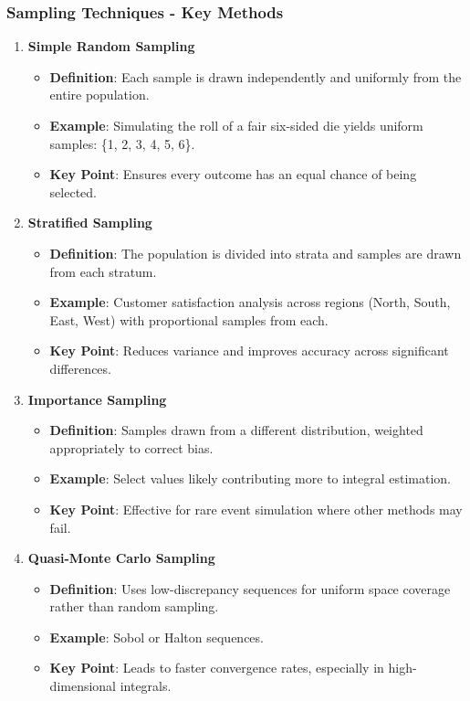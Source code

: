 \documentclass[aspectratio=169]{beamer}
\begin{document}
\begin{frame}[fragile]
  \frametitle{Sampling Techniques - Key Methods}
  \begin{enumerate}
    \item \textbf{Simple Random Sampling}
      \begin{itemize}
        \item \textbf{Definition}: Each sample is drawn independently and uniformly from the entire population.
        \item \textbf{Example}: Simulating the roll of a fair six-sided die yields uniform samples: \{1, 2, 3, 4, 5, 6\}.
        \item \textbf{Key Point}: Ensures every outcome has an equal chance of being selected.
      \end{itemize}

    \item \textbf{Stratified Sampling}
      \begin{itemize}
        \item \textbf{Definition}: The population is divided into strata and samples are drawn from each stratum.
        \item \textbf{Example}: Customer satisfaction analysis across regions (North, South, East, West) with proportional samples from each.
        \item \textbf{Key Point}: Reduces variance and improves accuracy across significant differences.
      \end{itemize}
      
    \item \textbf{Importance Sampling}
      \begin{itemize}
        \item \textbf{Definition}: Samples drawn from a different distribution, weighted appropriately to correct bias.
        \item \textbf{Example}: Select values likely contributing more to integral estimation.
        \item \textbf{Key Point}: Effective for rare event simulation where other methods may fail.
      \end{itemize}

    \item \textbf{Quasi-Monte Carlo Sampling}
      \begin{itemize}
        \item \textbf{Definition}: Uses low-discrepancy sequences for uniform space coverage rather than random sampling.
        \item \textbf{Example}: Sobol or Halton sequences.
        \item \textbf{Key Point}: Leads to faster convergence rates, especially in high-dimensional integrals.
      \end{itemize}
  \end{enumerate}
\end{frame}
\end{document}

